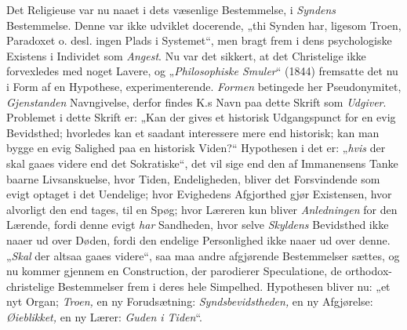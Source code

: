 \documentclass[12pt,a4paper]{book}
\begin{document}
Det Religieuse var nu naaet i dets væsenlige Bestemmelse, i \emph{Syndens}
Bestemmelse. Denne var ikke udviklet docerende, „thi Synden har, ligesom
Troen, Paradoxet o. desl. ingen Plads i Systemet“, men bragt frem i dens
psychologiske Existens i Individet som \emph{Angest}. Nu var det sikkert, at
det Christelige ikke forvexledes med noget Lavere, og „\emph{Philosophiske
Smuler}“ (1844) fremsatte det nu i Form af en Hypothese, experimenterende.
\emph{Formen} betingede her Pseudonymitet, \emph{Gjenstanden} Navngivelse,
derfor findes K.s Navn paa dette Skrift som \emph{Udgiver}. Problemet i
dette Skrift er: „Kan der gives et historisk Udgangspunct for en evig
Bevidsthed; hvorledes kan et saadant interessere mere end historisk; kan man
bygge en evig Salighed paa en historisk Viden?“ Hypothesen i det er:
„\emph{hvis} der skal gaaes videre end det Sokratiske“, det vil sige end den
af Immanensens Tanke baarne Livsanskuelse, hvor Tiden, Endeligheden, bliver
det Forsvindende som evigt optaget i det Uendelige; hvor Evighedens
Afgjorthed gjør Existensen, hvor alvorligt den end tages, til en Spøg; hvor
Læreren kun bliver \emph{Anledningen} for den Lærende, fordi denne evigt
\emph{har} Sandheden, hvor selve \emph{Skyldens} Bevidsthed ikke naaer ud
over Døden, fordi den endelige Personlighed ikke naaer ud over denne.
„\emph{Skal} der altsaa gaaes videre“, saa maa andre afgjørende
Bestemmelser sættes, og nu kommer gjennem en Construction, der parodierer
Speculatione, de orthodox-christelige Bestemmelser frem i deres hele
Simpelhed. Hypothesen bliver nu: „et nyt Organ; \emph{Troen,} en ny
Forudsætning: \emph{Syndsbevidstheden,} en ny Afgjørelse: \emph{Øieblikket,} en ny Lærer:
\emph{Guden i Tiden}“.
\end{document}
